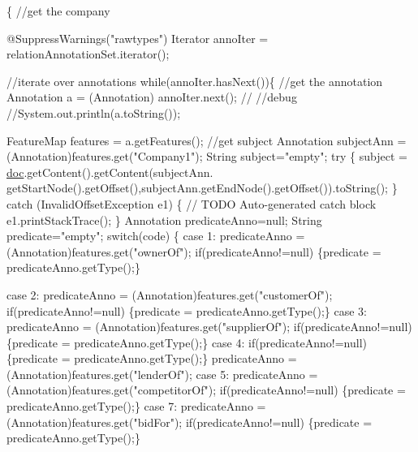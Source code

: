 \begin{DoxyCode}
                                                                      \{     
        \textcolor{comment}{//get the company}

        @SuppressWarnings(\textcolor{stringliteral}{"rawtypes"})
        Iterator annoIter = relationAnnotationSet.iterator();

        \textcolor{comment}{//iterate over annotations}
        while(annoIter.hasNext())\{
            \textcolor{comment}{//get the annotation}
            Annotation a = (Annotation) annoIter.next();
            \textcolor{comment}{//}
            \textcolor{comment}{//debug}
            \textcolor{comment}{//System.out.println(a.toString());}

            FeatureMap features = a.getFeatures();
            \textcolor{comment}{//get subject}
            Annotation subjectAnn = (Annotation)features.get(\textcolor{stringliteral}{"Company1"});
            String subject=\textcolor{stringliteral}{"empty"};
            \textcolor{keywordflow}{try} \{
                subject = \hyperlink{class_h_l_t_tutorial_adc313cb5e485ec03e21897d5c0132591}{doc}.getContent().getContent(subjectAnn.
      getStartNode().getOffset(),subjectAnn.getEndNode().getOffset()).toString();
            \} \textcolor{keywordflow}{catch} (InvalidOffsetException e1) \{
                \textcolor{comment}{// TODO Auto-generated catch block}
                e1.printStackTrace();
            \}
            Annotation predicateAnno=null;
            String predicate=\textcolor{stringliteral}{"empty"};
            \textcolor{keywordflow}{switch}(code)
            \{
            \textcolor{keywordflow}{case} 1:
                predicateAnno = (Annotation)features.get(\textcolor{stringliteral}{"ownerOf"});
                \textcolor{keywordflow}{if}(predicateAnno!=null)
                \{predicate = predicateAnno.getType();\}

            \textcolor{keywordflow}{case} 2:
                predicateAnno = (Annotation)features.get(\textcolor{stringliteral}{"customerOf"});
                \textcolor{keywordflow}{if}(predicateAnno!=null)
                \{predicate = predicateAnno.getType();\}
            \textcolor{keywordflow}{case} 3:
                predicateAnno = (Annotation)features.get(\textcolor{stringliteral}{"supplierOf"});        
                \textcolor{keywordflow}{if}(predicateAnno!=null)
                \{predicate = predicateAnno.getType();\}
            \textcolor{keywordflow}{case} 4:
                \textcolor{keywordflow}{if}(predicateAnno!=null)
                \{predicate = predicateAnno.getType();\}
                predicateAnno = (Annotation)features.get(\textcolor{stringliteral}{"lenderOf"});
            \textcolor{keywordflow}{case} 5:
                predicateAnno = (Annotation)features.get(\textcolor{stringliteral}{"competitorOf"});
                \textcolor{keywordflow}{if}(predicateAnno!=null)
                \{predicate = predicateAnno.getType();\}          
            \textcolor{keywordflow}{case} 7:
                predicateAnno = (Annotation)features.get(\textcolor{stringliteral}{"bidFor"});
                \textcolor{keywordflow}{if}(predicateAnno!=null)
                \{predicate = predicateAnno.getType();\}          


\end{DoxyCode}
